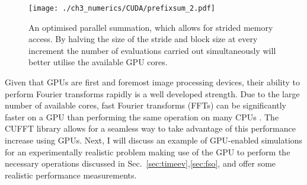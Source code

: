 \begin{figure}
    \centering
    \texttt{[image: ./ch3\_numerics/CUDA/prefixsum\_2.pdf]}
    \caption{An optimised parallel summation, which allows for strided memory access. By halving the size of the stride and block size at every increment the number of evaluations carried out simultaneously will better utilise the available GPU cores.}
    \label{fig:prefixsum2}
\end{figure}

Given that GPUs are first and foremost image processing devices, their ability to perform Fourier transforms rapidly is a well developed strength. Due to the large number of available cores, fast Fourier transforms (FFTs) can be significantly faster on a GPU than performing the same operation on many CPUs \cite{AO:Morgan_pra_2013}. The CUFFT library allows for a seamless way to take advantage of this performance increase using GPUs. Next, I will discuss an example of GPU-enabled simulations for an experimentally realistic problem making use of the GPU to perform the necessary operations discussed in Sec.~\ref{sec:timeev},\ref{sec:fso}, and offer some realistic performance measurements.

